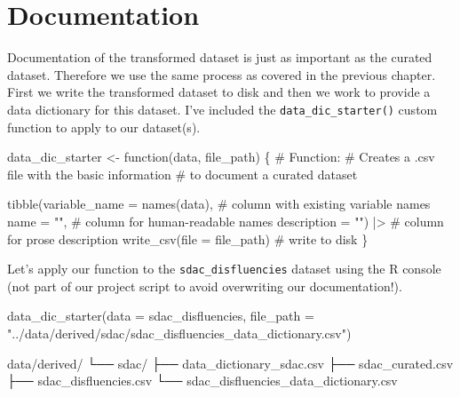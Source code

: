 \documentclass[
  letterpaper,
]{latex/krantz}
\newenvironment{Shaded}{\begin{snugshade}}{\end{snugshade}}
\newcommand{\AttributeTok}[1]{\textcolor[rgb]{0.40,0.45,0.13}{#1}}
\newcommand{\CommentTok}[1]{\textcolor[rgb]{0.37,0.37,0.37}{#1}}
\newcommand{\ControlFlowTok}[1]{\textcolor[rgb]{0.00,0.23,0.31}{#1}}
\newcommand{\ExtensionTok}[1]{\textcolor[rgb]{0.00,0.23,0.31}{#1}}
\newcommand{\FunctionTok}[1]{\textcolor[rgb]{0.28,0.35,0.67}{#1}}
\newcommand{\NormalTok}[1]{\textcolor[rgb]{0.00,0.23,0.31}{#1}}
\newcommand{\OtherTok}[1]{\textcolor[rgb]{0.00,0.23,0.31}{#1}}
\newcommand{\SpecialCharTok}[1]{\textcolor[rgb]{0.37,0.37,0.37}{#1}}
\newcommand{\StringTok}[1]{\textcolor[rgb]{0.13,0.47,0.30}{#1}}
\begin{document}
\hypertarget{documentation-3}{%
\section{Documentation}\label{documentation-3}}

Documentation of the transformed dataset is just as important as the
curated dataset. Therefore we use the same process as covered in the
previous chapter. First we write the transformed dataset to disk and
then we work to provide a data dictionary for this dataset. I've
included the \texttt{data\_dic\_starter()} custom function to apply to
our dataset(s).

\begin{Shaded}
\begin{Highlighting}[]
\NormalTok{data\_dic\_starter }\OtherTok{\textless{}{-}} \ControlFlowTok{function}\NormalTok{(data, file\_path) \{}
  \CommentTok{\# Function:}
  \CommentTok{\# Creates a .csv file with the basic information}
  \CommentTok{\# to document a curated dataset}
  
  \FunctionTok{tibble}\NormalTok{(}\AttributeTok{variable\_name =} \FunctionTok{names}\NormalTok{(data), }\CommentTok{\# column with existing variable names }
       \AttributeTok{name =} \StringTok{""}\NormalTok{, }\CommentTok{\# column for human{-}readable names}
       \AttributeTok{description =} \StringTok{""}\NormalTok{) }\SpecialCharTok{|\textgreater{}} \CommentTok{\# column for prose description}
  \FunctionTok{write\_csv}\NormalTok{(}\AttributeTok{file =}\NormalTok{ file\_path) }\CommentTok{\# write to disk}
\NormalTok{\}}
\end{Highlighting}
\end{Shaded}

Let's apply our function to the \texttt{sdac\_disfluencies} dataset
using the R console (not part of our project script to avoid overwriting
our documentation!).

\begin{Shaded}
\begin{Highlighting}[]
\FunctionTok{data\_dic\_starter}\NormalTok{(}\AttributeTok{data =}\NormalTok{ sdac\_disfluencies, }\AttributeTok{file\_path =} \StringTok{"../data/derived/sdac/sdac\_disfluencies\_data\_dictionary.csv"}\NormalTok{)}
\end{Highlighting}
\end{Shaded}

\begin{Shaded}
\begin{Highlighting}[]
\ExtensionTok{data/derived/}
\ExtensionTok{└──}\NormalTok{ sdac/}
    \ExtensionTok{├──}\NormalTok{ data\_dictionary\_sdac.csv}
    \ExtensionTok{├──}\NormalTok{ sdac\_curated.csv}
    \ExtensionTok{├──}\NormalTok{ sdac\_disfluencies.csv}
    \ExtensionTok{└──}\NormalTok{ sdac\_disfluencies\_data\_dictionary.csv}
\end{Highlighting}
\end{Shaded}
\end{document}
